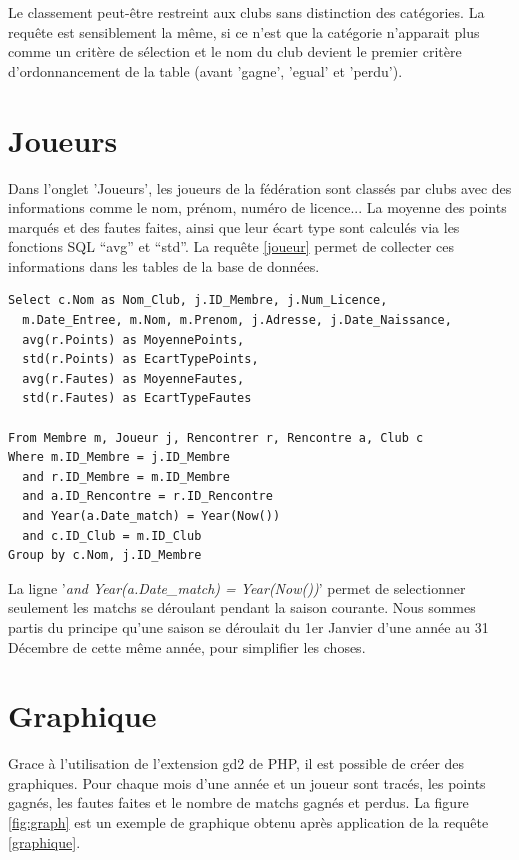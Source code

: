 \documentclass[a4paper»,8pt,french,fleqn]{report}
\begin{document}
Le classement peut-être restreint aux clubs sans distinction des catégories. La requête est sensiblement la même, si ce n'est que la catégorie n'apparait plus comme un critère de sélection et le nom du club devient le premier critère d'ordonnancement de la table (avant 'gagne', 'egual' et 'perdu'). 


\section{Joueurs}
Dans l'onglet 'Joueurs', les joueurs de la fédération sont classés par clubs avec des informations comme le nom, prénom, numéro de licence... La moyenne des points marqués et des fautes faites, ainsi que leur écart type sont calculés via les fonctions SQL ``avg'' et ``std''. La requête \ref{joueur} permet de collecter ces informations dans les tables de la base de données.

\begin{lstlisting}
Select c.Nom as Nom_Club, j.ID_Membre, j.Num_Licence, 
  m.Date_Entree, m.Nom, m.Prenom, j.Adresse, j.Date_Naissance,
  avg(r.Points) as MoyennePoints,
  std(r.Points) as EcartTypePoints,
  avg(r.Fautes) as MoyenneFautes,
  std(r.Fautes) as EcartTypeFautes

From Membre m, Joueur j, Rencontrer r, Rencontre a, Club c
Where m.ID_Membre = j.ID_Membre
  and r.ID_Membre = m.ID_Membre
  and a.ID_Rencontre = r.ID_Rencontre
  and Year(a.Date_match) = Year(Now())
  and c.ID_Club = m.ID_Club
Group by c.Nom, j.ID_Membre
\end{lstlisting}

La ligne '\textit{and Year(a.Date\_match) = Year(Now())}' permet de selectionner seulement les matchs se déroulant pendant la saison courante. Nous sommes partis du principe qu'une saison se déroulait du 1er Janvier d'une année au 31 Décembre de cette même année, pour simplifier les choses.


\section{Graphique}
Grace à l'utilisation de l'extension gd2 de PHP, il est possible de créer des graphiques. Pour chaque mois d'une année et un joueur sont tracés, les points gagnés, les fautes faites et le nombre de matchs gagnés et perdus. La figure \ref{fig:graph} est un exemple de graphique obtenu après application de la requête \ref{graphique}.
\end{document}
